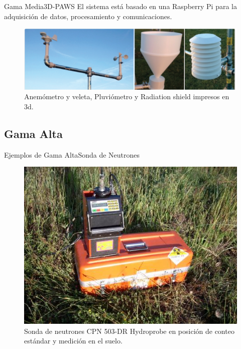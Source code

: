 \documentclass[]{beamer}
\begin{document}
\begin{frame}{Gama Media}{3D-PAWS}
El sistema está basado en una Raspberry Pi para la adquisición de datos, procesamiento y comunicaciones.

\begin{figure}
  \includegraphics[height=0.4\textheight]{Docs/3dpaws2}
  \caption{Anemómetro y veleta, Pluviómetro y Radiation shield impresos en 3d.}
  \label{}
\end{figure}
\end{frame}

\subsection{Gama Alta}
\begin{frame}{Ejemplos de Gama Alta}{Sonda de Neutrones}
  \begin{figure}
    \includegraphics[height=0.7\textheight]{Docs/sondaneutrones}
    \caption{Sonda de neutrones CPN 503-DR Hydroprobe en posición de conteo estándar y medición en el suelo. }
    \label{}
  \end{figure}

\end{frame}
\end{document}
